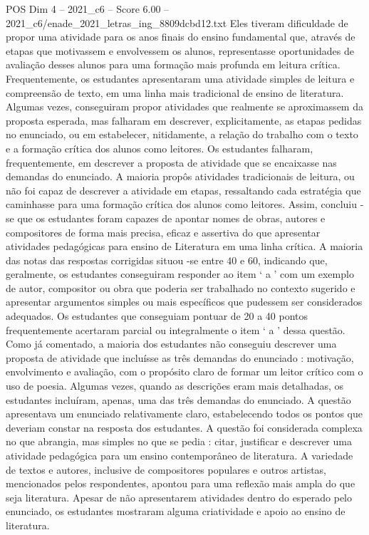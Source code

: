 \begin{textsample}{POS Dim 4 – 2021\_c6 – Score 6.00 – 2021\_c6/enade\_2021\_letras\_ing\_8809dcbd12.txt}
Eles tiveram dificuldade de propor uma atividade para os anos finais do ensino fundamental que, através de etapas que motivassem e envolvessem os alunos, representasse oportunidades de avaliação desses alunos para uma formação mais profunda em leitura crítica.
Frequentemente, os estudantes apresentaram uma atividade simples de leitura e compreensão de texto, em uma linha mais tradicional de ensino de literatura.
Algumas vezes, conseguiram propor atividades que realmente se aproximassem da proposta esperada, mas falharam em descrever, explicitamente, as etapas pedidas no enunciado, ou em estabelecer, nitidamente, a relação do trabalho com o texto e a formação crítica dos alunos como leitores.
Os estudantes falharam, frequentemente, em descrever a proposta de atividade que se encaixasse nas demandas do enunciado.
A maioria propôs atividades tradicionais de leitura, ou não foi capaz de descrever a atividade em etapas, ressaltando cada estratégia que caminhasse para uma formação crítica dos alunos como leitores.
Assim, concluiu -se que os estudantes foram capazes de apontar nomes de obras, autores e compositores de forma mais precisa, eficaz e assertiva do que apresentar atividades pedagógicas para ensino de Literatura em uma linha crítica.
A maioria das notas das respostas corrigidas situou -se entre 40 e 60, indicando que, geralmente, os estudantes conseguiram responder ao item ‘ a ’ com um exemplo de autor, compositor ou obra que poderia ser trabalhado no contexto sugerido e apresentar argumentos simples ou mais específicos que pudessem ser considerados adequados.
Os estudantes que conseguiam pontuar de 20 a 40 pontos frequentemente acertaram parcial ou integralmente o item ‘ a ’ dessa questão.
Como já comentado, a maioria dos estudantes não conseguiu descrever uma proposta de atividade que incluísse as três demandas do enunciado : motivação, envolvimento e avaliação, com o propósito claro de formar um leitor crítico com o uso de poesia.
Algumas vezes, quando as descrições eram mais detalhadas, os estudantes incluíram, apenas, uma das três demandas do enunciado.
A questão apresentava um enunciado relativamente claro, estabelecendo todos os pontos que deveriam constar na resposta dos estudantes.
A questão foi considerada complexa no que abrangia, mas simples no que se pedia : citar, justificar e descrever uma atividade pedagógica para um ensino contemporâneo de literatura.
A variedade de textos e autores, inclusive de compositores populares e outros artistas, mencionados pelos respondentes, apontou para uma reflexão mais ampla do que seja literatura.
Apesar de não apresentarem atividades dentro do esperado pelo enunciado, os estudantes mostraram alguma criatividade e apoio ao ensino de literatura.

\end{textsample}
